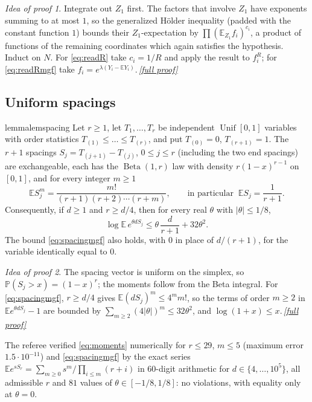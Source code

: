 \documentclass[11pt,a4paper]{article}
\theoremstyle{plain}
\theoremstyle{definition}
\theoremstyle{remark}
\newtheorem*{proofidea}{Idea of proof}
\newcommand{\fullproofref}[1]{\,\hyperref[#1]{\textit{[full proof]}}}
\newcommand{\EE}{\mathbb E}
\newcommand{\PP}{\mathbb P}
\newcommand{\Unif}{\operatorname{Unif}}
\newcommand{\Beta}{\operatorname{Beta}}
\begin{document}
\begin{proofidea}
Integrate out $Z_1$ first. The factors that involve $Z_1$ have exponents summing to at most $1$, so the generalized H\"older inequality (padded with the constant function $1$) bounds their $Z_1$-expectation by $\prod(\EE_{Z_1}f_i)^{c_i}$, a product of functions of the remaining coordinates which again satisfies the hypothesis. Induct on $N$. For \eqref{eq:readR} take $c_i=1/R$ and apply the result to $f_i^R$; for \eqref{eq:readRmgf} take $f_i=e^{\lambda(Y_i-\EE Y_i)}$.\fullproofref{pf:finner}
\end{proofidea}

\subsection{Uniform spacings}

\begin{restatable}{lemma}{lemspacing}\label{lem:spacing}
Let $r\ge1$, let $T_1,\dots,T_r$ be independent $\Unif[0,1]$ variables with order statistics $T_{(1)}\le\dots\le T_{(r)}$, and put $T_{(0)}=0$, $T_{(r+1)}=1$. The $r+1$ spacings $S_j=T_{(j+1)}-T_{(j)}$, $0\le j\le r$ \textup{(}including the two end spacings\textup{)} are exchangeable, each has the $\Beta(1,r)$ law with density $r(1-x)^{r-1}$ on $[0,1]$, and for every integer $m\ge1$
\begin{equation}\label{eq:moments}
 \EE S_j^{m}=\frac{m!}{(r+1)(r+2)\cdots(r+m)},\qquad\text{in particular }\ \EE S_j=\frac1{r+1}.
\end{equation}
Consequently, if $d\ge1$ and $r\ge d/4$, then for every real $\theta$ with $|\theta|\le1/8$,
\begin{equation}\label{eq:spacingmgf}
 \log\EE\, e^{\theta dS_j}\le\theta\,\frac d{r+1}+32\theta^2 .
\end{equation}
The bound \eqref{eq:spacingmgf} also holds, with $0$ in place of $d/(r+1)$, for the variable identically equal to $0$.
\end{restatable}

\begin{proofidea}
The spacing vector is uniform on the simplex, so $\PP(S_j>x)=(1-x)^r$; the moments follow from the Beta integral. For \eqref{eq:spacingmgf}, $r\ge d/4$ gives $\EE(dS_j)^m\le4^m m!$, so the terms of order $m\ge2$ in $\EE e^{\theta dS_j}-1$ are bounded by $\sum_{m\ge2}(4|\theta|)^m\le32\theta^2$, and $\log(1+x)\le x$.\fullproofref{pf:spacing}
\end{proofidea}

The referee verified \eqref{eq:moments} numerically for $r\le29$, $m\le5$ (maximum error $1.5\cdot10^{-11}$) and \eqref{eq:spacingmgf} by the exact series $\EE e^{sS_r}=\sum_{m\ge0}s^m/\prod_{i\le m}(r+i)$ in 60-digit arithmetic for $d\in\{4,\dots,10^5\}$, all admissible $r$ and $81$ values of $\theta\in[-1/8,1/8]$: no violations, with equality only at $\theta=0$.
\end{document}
